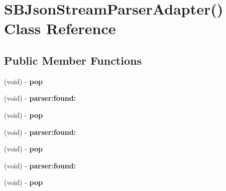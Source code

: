 \hypertarget{interface_s_b_json_stream_parser_adapter_07_08}{
\section{\-S\-B\-Json\-Stream\-Parser\-Adapter() \-Class \-Reference}
\label{interface_s_b_json_stream_parser_adapter_07_08}
}
\subsection*{\-Public \-Member \-Functions}
\begin{DoxyCompactItemize}
\item 
\hypertarget{interface_s_b_json_stream_parser_adapter_07_08_a3dc3665abef287573c9fad2a9eabb6b3}{
(void) -\/ {\bfseries pop}}
\label{interface_s_b_json_stream_parser_adapter_07_08_a3dc3665abef287573c9fad2a9eabb6b3}

\item 
\hypertarget{interface_s_b_json_stream_parser_adapter_07_08_af2059c2ce23ed04a633afe6d331291e0}{
(void) -\/ {\bfseries parser\-:found\-:}}
\label{interface_s_b_json_stream_parser_adapter_07_08_af2059c2ce23ed04a633afe6d331291e0}

\item 
\hypertarget{interface_s_b_json_stream_parser_adapter_07_08_a3dc3665abef287573c9fad2a9eabb6b3}{
(void) -\/ {\bfseries pop}}
\label{interface_s_b_json_stream_parser_adapter_07_08_a3dc3665abef287573c9fad2a9eabb6b3}

\item 
\hypertarget{interface_s_b_json_stream_parser_adapter_07_08_af2059c2ce23ed04a633afe6d331291e0}{
(void) -\/ {\bfseries parser\-:found\-:}}
\label{interface_s_b_json_stream_parser_adapter_07_08_af2059c2ce23ed04a633afe6d331291e0}

\item 
\hypertarget{interface_s_b_json_stream_parser_adapter_07_08_a3dc3665abef287573c9fad2a9eabb6b3}{
(void) -\/ {\bfseries pop}}
\label{interface_s_b_json_stream_parser_adapter_07_08_a3dc3665abef287573c9fad2a9eabb6b3}

\item 
\hypertarget{interface_s_b_json_stream_parser_adapter_07_08_af2059c2ce23ed04a633afe6d331291e0}{
(void) -\/ {\bfseries parser\-:found\-:}}
\label{interface_s_b_json_stream_parser_adapter_07_08_af2059c2ce23ed04a633afe6d331291e0}

\item 
\hypertarget{interface_s_b_json_stream_parser_adapter_07_08_a3dc3665abef287573c9fad2a9eabb6b3}{
(void) -\/ {\bfseries pop}}
\label{interface_s_b_json_stream_parser_adapter_07_08_a3dc3665abef287573c9fad2a9eabb6b3}


\end{DoxyCompactItemize}
